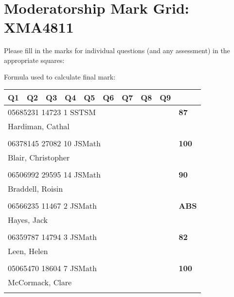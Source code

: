 \documentclass[a4paper,12pt]{article}
\begin{document}
\section*{Moderatorship Mark Grid: XMA4811}

Please fill in the marks for individual questions (and any assessment)
in the appropriate squares:

\vskip12pt

Formula used to calculate final mark:

\vskip60pt


\begin{tabular}{
   |p{9mm}|
    p{9mm}|
    p{9mm}|
    p{9mm}|
    p{9mm}|
    p{9mm}|
    p{9mm}|
    p{9mm}|
    p{9mm}|
    p{9mm}|}
\hline\hline
Q1 & Q2 & Q3 & Q4 & Q5 & Q6 & Q7 & Q8 & Q9 &     \\
\hline\hline
\multicolumn{9}{|l|}{05685231 14723 1 SSTSM} & \textbf{87} \\
\hline
\multicolumn{10}{|l|}{Hardiman, Cathal} \\
\hline
   \vrule height8mm width0pt depth2mm 
      &    &    &    &    &    &    &    &    &     \\
\hline\hline
\multicolumn{9}{|l|}{06378145 27082 10 JSMath} & \textbf{100} \\
\hline
\multicolumn{10}{|l|}{Blair, Christopher} \\
\hline
   \vrule height8mm width0pt depth2mm 
      &    &    &    &    &    &    &    &    &     \\
\hline\hline
\multicolumn{9}{|l|}{06506992 29595 14 JSMath} & \textbf{90} \\
\hline
\multicolumn{10}{|l|}{Braddell, Roisin} \\
\hline
   \vrule height8mm width0pt depth2mm 
      &    &    &    &    &    &    &    &    &     \\
\hline\hline
\multicolumn{9}{|l|}{06566235 11467 2 JSMath} & \textbf{ABS} \\
\hline
\multicolumn{10}{|l|}{Hayes, Jack} \\
\hline
   \vrule height8mm width0pt depth2mm 
      &    &    &    &    &    &    &    &    &     \\
\hline\hline
\multicolumn{9}{|l|}{06359787 14794 3 JSMath} & \textbf{82} \\
\hline
\multicolumn{10}{|l|}{Leen, Helen} \\
\hline
   \vrule height8mm width0pt depth2mm 
      &    &    &    &    &    &    &    &    &     \\
\hline\hline
\multicolumn{9}{|l|}{05065470 18604 7 JSMath} & \textbf{100} \\
\hline
\multicolumn{10}{|l|}{McCormack, Clare} \\
\hline
   \vrule height8mm width0pt depth2mm 
      &    &    &    &    &    &    &    &    &     \\
\hline\hline
\end{tabular}
\newpage
\end{document}
